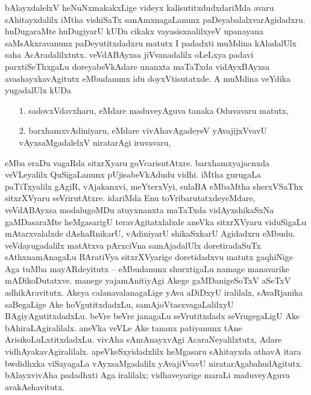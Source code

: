 bAlayxdalelxV heNuNxmakakxLige videyx kalisutitxdudxdariMda avaru sAhitayxdalilx iMtha vishiSaTx sanAmxnagaLanunx paDeyabalalxvarAgidadxru. huDugaraMte huDugiyarU kUDa cikakx vayasisxnalilxyeV upanayana saMsAkxravanunx paDeyutitxdadxru matutx I padadxti muMdina kAladalUlx saha AcAradalilxtutx. veVdABAyxsa jiVvanadalilx oLeLxya padavi parxtiSeThxgaLu doreyabeVkAdare unanxta maTaTxda vidAyxBAyxsa avashayxkavAgitutx eMbudanunx idu doyxVtisutatxde. A muMdina veYdika yugadalUlx kUDa 
\begin{enumerate}
\item[{\rm 1.}] sadovxVdavxharu, eMdare maduveyAguva tanaka Oduvavaru matutx,
\item[{\rm 2.}] barxhamxvAdiniyaru, eMdare vivAhavAgadeyeV yAvajijxVvavU vAyxsaMgadalelxV niratarAgi iruvavaru, 
\end{enumerate}
eMba eraDu vagaRda sitxrXyaru goVcarisutAtxre. barxhamxyajacnxda veVLeyalilx QuSigaLanunx pUjisabeVkAdudu vidhi. iMtha gurugaLa paTiTxyalilx gAgiR, vAjakanxvi, meYterxVyi, sulaBA eMbaMtha sherxVSaThx sitxrXVyaru seVrirutAtxre. idariMda Enu toVribarutatxdeyeMdare, veVdABAyxsa modalugoMDu atuyxnanxta maTaTxda vidAyxshikaSxNa gaMDasaraMte heMgasarigU teravAgitatxlalxde aneVka sitxrXVyaru viduSigaLu mAtarxvalalxde dAshaRnikarU, vAdiniyarU shikaSxkarU Agidadxru eMbudu. veVdayugadalilx matAtxva pArxciVna samAjadalUlx doretiradaSuTx sAthxnamAnagaLu BAratiVya sitxrXVyarige doretidadxvu matutx gaqhiNige Aga tuMba mayARdeyitutx -- eMbudanunx shurxtigaLu namage manavarike mADikoDutatxve. manege yajamAnitiyAgi Akege gaMDanigeSoTxV aSeTxV adhikAravitutx. Akeya calanavalanagaLige yAva aDiDxyU iralilalx, sAvaRjanika saBegaLige Ake hoVgutitxdadxLu, samAjoVtasxvagaLalilxyU BAgiyAgutitxdadxLu. beVre beVre janagaLu seVrutitxdadx seVrugegaLigU Ake bAhiraLAgiralilalx. aneVka veVLe Ake tananx patiyanunx tAne ArisikoLuLxtitxdadxLu. vivAha sAmAnayxvAgi AcaraNeyalilxtutx, Adare vidhAyakavAgiralilalx. apeVkeSxyidadxlilx heMgasaru sAhitayxda athavA itara bwdidhxka viSayagaLa vAyxsaMgadalilx yAvajiVvavU niratarAgabahudAgitutx. bAlayxvivAha padadhxti Aga iralilalx; vidhaveyarige maraLi maduveyAguva avakAshavitutx. 

